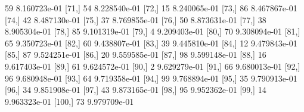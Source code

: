 \documentclass{article}
\begin{document}
\begin{Schunk}
\begin{Soutput}
 [70,]     59 8.160723e-01
 [71,]     54 8.228540e-01
 [72,]     15 8.240065e-01
 [73,]     86 8.467867e-01
 [74,]     42 8.487130e-01
 [75,]     37 8.769855e-01
 [76,]     50 8.873631e-01
 [77,]     38 8.905304e-01
 [78,]     85 9.101319e-01
 [79,]      4 9.209403e-01
 [80,]     70 9.308094e-01
 [81,]     65 9.350723e-01
 [82,]     60 9.438807e-01
 [83,]     39 9.445810e-01
 [84,]     12 9.479843e-01
 [85,]     87 9.524251e-01
 [86,]     20 9.559585e-01
 [87,]     98 9.599148e-01
 [88,]     16 9.617403e-01
 [89,]     61 9.624572e-01
 [90,]      2 9.629279e-01
 [91,]     66 9.680013e-01
 [92,]     96 9.680948e-01
 [93,]     64 9.719358e-01
 [94,]     99 9.768894e-01
 [95,]     35 9.790913e-01
 [96,]     34 9.851908e-01
 [97,]     43 9.873165e-01
 [98,]     95 9.952362e-01
 [99,]     14 9.963323e-01
[100,]     73 9.979709e-01
\end{Soutput}
\end{Schunk}
\end{document}
